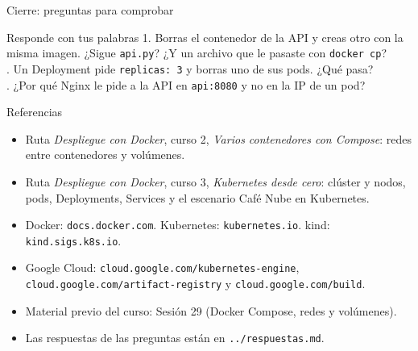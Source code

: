 \documentclass[aspectratio=169,10pt,c]{beamer}
\begin{document}
\begin{frame}{Cierre: preguntas para comprobar}
\begin{block}{Responde con tus palabras}
\small
1. Borras el contenedor de la API y creas otro con la misma imagen. ¿Sigue \texttt{api.py}? ¿Y un archivo que le pasaste con \texttt{docker cp}?\\. Un Deployment pide \texttt{replicas: 3} y borras uno de sus pods. ¿Qué pasa?\\. ¿Por qué Nginx le pide a la API en \texttt{api:8080} y no en la IP de un pod?
\end{block}
\end{frame}

\begin{frame}{Referencias}
\scriptsize
\begin{itemize}\setlength\itemsep{4pt}
  \item Ruta \textit{Despliegue con Docker}, curso 2, \textit{Varios contenedores con Compose}: redes entre contenedores y volúmenes.
  \item Ruta \textit{Despliegue con Docker}, curso 3, \textit{Kubernetes desde cero}: clúster y nodos, pods, Deployments, Services y el escenario Café Nube en Kubernetes.
  \item Docker: \texttt{docs.docker.com}. Kubernetes: \texttt{kubernetes.io}. kind: \texttt{kind.sigs.k8s.io}.
  \item Google Cloud: \texttt{cloud.google.com/kubernetes-engine}, \texttt{cloud.google.com/artifact-registry} y \texttt{cloud.google.com/build}.
  \item Material previo del curso: Sesión 29 (Docker Compose, redes y volúmenes).
  \item Las respuestas de las preguntas están en \texttt{../respuestas.md}.
\end{itemize}
\end{frame}
\end{document}
